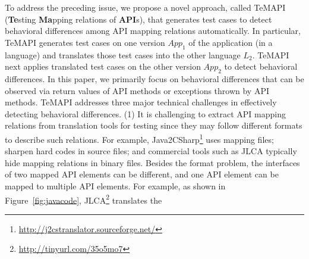%

To address the preceding issue, we propose a novel approach, called TeMAPI (\textbf{Te}sting \textbf{Ma}pping relations of \textbf{API}s), that generates test cases to detect behavioral differences among API mapping relations automatically. In particular, TeMAPI generates test cases on one version $App_1$ of the application (in a language) and translates those test cases into the other language $L_2$. TeMAPI next applies translated test cases on the other version $App_2$ to detect behavioral differences. In this paper, we primarily focus on behavioral differences that can be observed via return values of API methods or exceptions thrown by API methods. TeMAPI addresses three major technical challenges in effectively detecting behavioral differences. (1) It is challenging to extract API mapping relations from translation tools for testing since they may follow different formats to describe such relations. For example, Java2CSharp\footnote{\url{http://j2cstranslator.sourceforge.net/}} uses mapping files; sharpen hard codes in source files; and commercial tools such as JLCA typically hide mapping relations in binary files. Besides the format problem, the interfaces of two mapped API elements can be different, and one API element can be mapped to multiple API elements. For example, as shown in Figure~\ref{fig:javacode}, JLCA\footnote{\url{http://tinyurl.com/35o5mo7}} translates the
